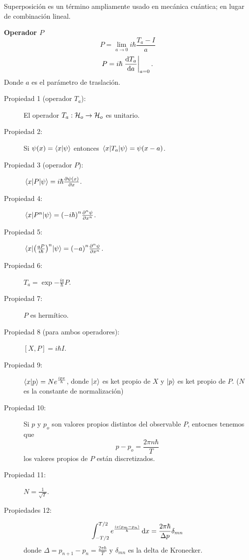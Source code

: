 Superposición es un término ampliamente usado en mecánica cuántica; en lugar de combinación lineal. 

\begin{definition}
    \textbf{Operador $P$}\\
        $$ P = \lim_{a\to 0} i\hbar \frac{T_a - I}{a} $$
        $$ P = i\hbar \left. \dv{T_a}{a} \right|_{a=0}. $$
        Donde $a$ es el parámetro de traslación.
\end{definition}

\begin{description}
    \item[Propiedad 1 (operador $T_a$): ] El operador $T_a : \mathcal{H} _o \to \mathcal{H} _o$ es unitario.
    \item[Propiedad 2: ] Si $\psi (x) = \braket{x}{\psi}$ entonces $\mel{x}{T_a}{\psi} = \psi (x - a)$. 
    \item[Propiedad 3 (operador $P$): ] $\mel{x}{P}{\psi} = i\hbar \pdv{\psi (x)}{x}$.
    \item[Propiedad 4: ] $\mel{x}{P^n}{\psi} = \qty(-i\hbar)^n \pdv[n]{\psi}{x}$. 
    \item[Propiedad 5: ] $\mel{x}{\qty(\frac{aP}{i\hbar})^n}{\psi} = \qty(-a)^n \pdv[n]{\psi}{x}$.
    \item[Propiedad 6: ] $T_a = \exp{-\frac{ia}{\hbar} P}$. 
    \item[Propiedad 7: ] $P$ es hermítico.
    \item[Propiedad 8 (para ambos operadores): ] $[X,P] = i\hbar I$.
    \item[Propiedad 9:] $\braket{x}{p} = N e^{\frac{ipx}{\hbar}}$, donde $\ket{x}$ es ket propio de $X$ y $\ket{p}$ es ket propio de $P$. ($N$ es la constante de normalización) 
    \item[Propiedad 10: ] Si $p$ y $p_o$ son valores propios distintos del observable $P$, entocnes tenemos que
        $$ p - p_o = \frac{2\pi n\hbar}{T} $$
    los valores propios de $P$ están discretizados.
    \item[Propiedad 11: ] $N = \frac{1}{\sqrt{T}}$.
    \item[Propiedades 12:] 
        $$ \int _{-T/2} ^{T/2} e^{\frac{ix \qty(p_m - p_n)}{\hbar}} \dd{x} = \frac{2\pi \hbar}{\Delta p} \delta _{mn} $$
    donde $\Delta = p_{n + 1} - p_n = \frac{2\pi \hbar}{T}$ y $\delta _{mn}$ es la delta de Kronecker.
\end{description}

